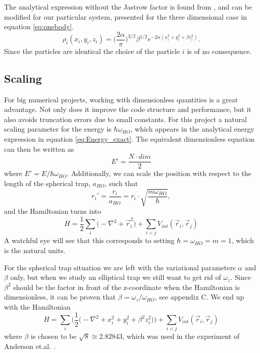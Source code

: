 \documentclass[norsk,a4paper,12pt]{article}
\begin{document}
The analytical expression without the Jastrow factor is found from \cite{DuBois}, and can be modified for our particular system, presented for the three dimensional case in equation \ref{eq:onebody}.
\begin{equation}
\rho_i(x_i, y_i, z_i)=\bigg(\frac{2\alpha}{\pi}\bigg)^{3/2}\beta^{1/2}e^{-2\alpha(x_i^2+y_i^2+\beta z_i^2)}.
\label{eq:onebody}
\end{equation}
Since the particles are identical the choice of the particle $i$ is of no consequence. 

\subsection{Scaling} \label{sec:scaling}
For big numerical projects, working with dimensionless quantities is a great advantage. Not only does it improve the code structure and performance, but it also avoids truncation errors due to small constants. For this project a natural scaling parameter for the energy is $\hbar\omega_{HO}$, which appears in the analytical energy expression in equation \ref{eq:Energy_exact}. The equivalent dimensionless equation can then be written as
\begin{equation}
E'=\frac{N\cdot dim}{2}
\end{equation}
where $E'=E/\hbar\omega_{HO}$. Additionally, we can scale the position with respect to the length of the spherical trap, $a_{HO}$, such that 
\begin{equation}
r_i'=\frac{r_i}{a_{HO}}=r_i\cdot\sqrt{\frac{m\omega_{HO}}{\hbar}},
\end{equation}
and the Hamiltonian turns into
\begin{equation}
H=\frac{1}{2}\sum_i\Big(-\nabla^2 + \vec{r}_i^2\Big)+\sum_{i<j}V_{int}(\vec{r}_i,\vec{r}_j)
\end{equation}
A watchful eye will see that this corresponds to setting $\hbar=\omega_{HO}=m=1$, which is the natural units. 

For the spherical trap situation we are left with the variational parameters $\alpha$ and $\beta$ only, but when we study an elliptical trap we still want to get rid of $\omega_z$. Since $\beta^2$ should be the factor in front of the z-coordinate when the Hamiltonian is dimensionless, it can be proven that $\beta=\omega_z/\omega_{HO}$, see appendix C. We end up with the Hamiltonian
\begin{equation}
H=\sum_i\bigg(\frac{1}{2}\Big(-\nabla^2 + x_i^2 + y_i^2 + \beta^2z_i^2\Big)\bigg)+\sum_{i<j}V_{int}(\vec{r}_i,\vec{r}_j)
\end{equation} 
where $\beta$ is chosen to be $\sqrt{8}\cong2.82843$, which was used in the experiment of Anderson et.al. \cite{Anderson}.
\end{document}
